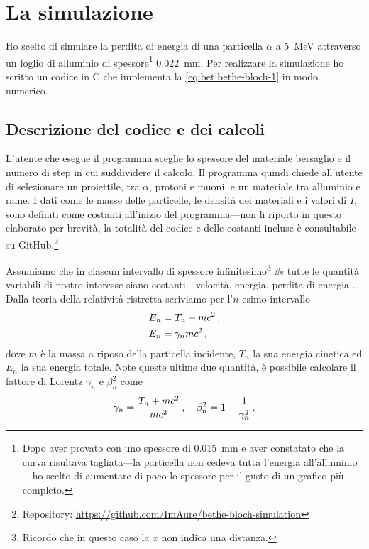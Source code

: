 \section{La simulazione}
    Ho scelto di simulare la perdita di energia di una particella $\alpha$ a \SI{5}{\mega\eV} attraverso un foglio di alluminio di spessore\footnote{Dopo aver provato con uno spessore di \SI{0.015}{\milli\meter} e aver constatato che la curva risultava tagliata---la particella non cedeva tutta l'energia all'alluminio---ho scelto di aumentare di poco lo spessore per il gusto di un grafico più completo.} \SI{0.022}{\milli\meter}. Per realizzare la simulazione ho scritto un codice in C che implementa la \eqref{eq:bet:bethe-bloch-1} in modo numerico.
    \subsection{Descrizione del codice e dei calcoli}
        L'utente che esegue il programma sceglie lo spessore del materiale bersaglio e il numero di step in cui suddividere il calcolo. Il programma quindi chiede all'utente di selezionare un proiettile, tra $\alpha$, protoni e muoni, e un materiale tra alluminio e rame. I dati come le masse delle particelle, le densità dei materiali e i valori di $I$, sono definiti come costanti all'inizio del programma---non li riporto in questo elaborato per brevità, la totalità del codice e delle costanti incluse è consultabile su GitHub.\footnote{Repository: \url{https://github.com/ImAure/bethe-bloch-simulation}}
        
        Assumiamo che in ciascun intervallo di spessore infinitesimo\footnote{Ricordo che in questo caso la $x$ non indica una distanza.} $\dd{s}$ tutte le quantità variabili di nostro interesse siano costanti---velocità, energia, perdita di energia \myetc. Dalla teoria della relatività ristretta scriviamo per l'$n$-esimo intervallo
        \begin{align*}   
                E_n &= T_n + m c^2 \,, \\
                E_n &= \gamma_n m c^2 \,,
        \end{align*}
        dove $m$ è la massa a riposo della particella incidente, $T_n$ la sua energia cinetica ed $E_n$ la sua energia totale. Note queste ultime due quantità, è possibile calcolare il fattore di Lorentz $\gamma_n$ e $\beta_n^2$ come
        \begin{equation*}
            \gamma_n = \frac{T_n + m c^2}{m c^2}
            \,,
            \quad
            \beta_n^2 = 1 - \frac{1}{\gamma_n^2}
            \,.
        \end{equation*}

